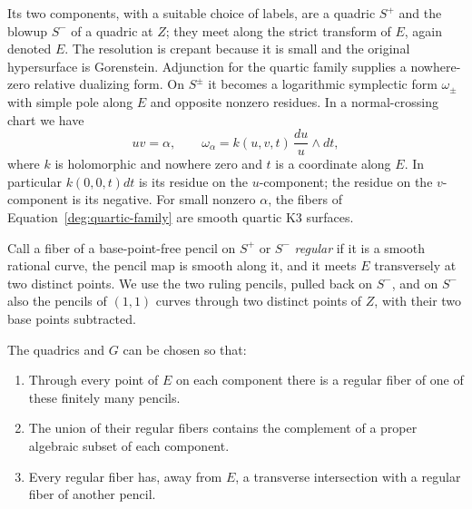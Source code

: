 Its two components, with a suitable choice of labels, are a quadric
$S^+$ and the blowup $S^-$ of a quadric at $Z$; they meet along the
strict transform of $E$, again denoted $E$.  The resolution is
crepant because it is small and the original hypersurface is
Gorenstein.  Adjunction for the quartic family supplies a nowhere-zero
relative dualizing form.  On $S^\pm$ it becomes a logarithmic
symplectic form $\omega_\pm$ with simple pole along $E$ and opposite
nonzero residues.  In a normal-crossing chart we have
\begin{equation}\label{deg:neck-form}
       uv=\alpha,\qquad
       \omega_\alpha=k(u,v,t)\,\frac{du}{u}\wedge dt,
\end{equation}
where $k$ is holomorphic and nowhere zero and $t$ is a coordinate
along $E$.  In particular $k(0,0,t)dt$ is its residue on the
$u$-component; the residue on the $v$-component is its negative.
For small nonzero $\alpha$, the fibers of
Equation~\eqref{deg:quartic-family} are smooth quartic K3 surfaces.

Call a fiber of a base-point-free pencil on $S^+$ or $S^-$
\emph{regular} if it is a smooth rational curve, the pencil map is
smooth along it, and it meets $E$ transversely at two distinct
points.  We use the two ruling pencils, pulled back on $S^-$, and
on $S^-$ also the pencils of $(1,1)$ curves through two distinct
points of $Z$, with their two base points subtracted.

\begin{lemma}\label{deg:regular-pencils}
The quadrics and $G$ can be chosen so that:
\begin{enumerate}
 \item Through every point of $E$ on each component there is a
       regular fiber of one of these finitely many pencils.
 \item The union of their regular fibers contains the complement
       of a proper algebraic subset of each component.
 \item Every regular fiber has, away from $E$, a transverse
       intersection with a regular fiber of another pencil.
\end{enumerate}
\end{lemma}

